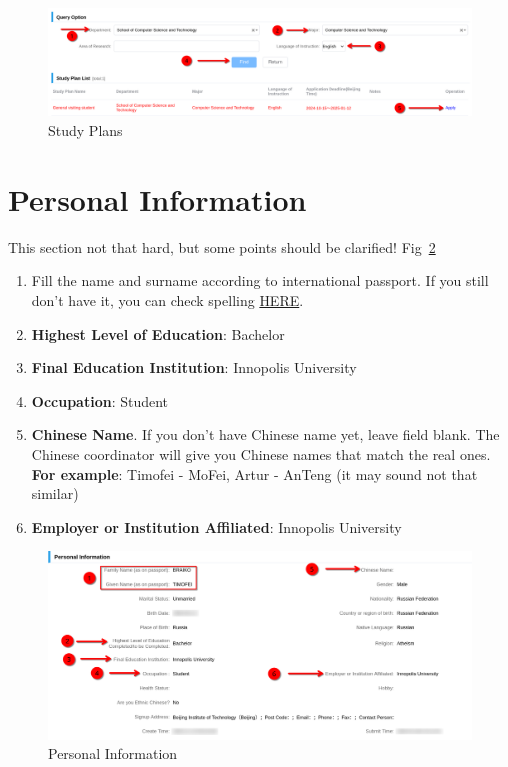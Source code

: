 \begin{figure}[htpb]
    \centering
    \includegraphics[width=\textwidth]{russia/imgs/app_3_study_plan}
    \caption{\centering Study Plans}
    \label{fig:ru_study_plan}
\end{figure}


\section{Personal Information}\label{sec:ru_personal_info}

This section not that hard, but some points should be clarified!
Fig~\ref{fig:ru_pers_info}

\begin{enumerate}
    \item Fill the name and surname according to international passport.
        If you still don't have it, you can check spelling
        \href{https://www.gosuslugi.ru/help/faq/foreign_passport/100359}{HERE}.

    \item \textbf{Highest Level of Education}: Bachelor

    \item \textbf{Final Education Institution}: Innopolis University

    \item \textbf{Occupation}: Student

    \item \textbf{Chinese Name}.
        If you don't have Chinese name yet, leave field blank.
        The Chinese coordinator will give you Chinese names that match the real ones. \\
        \textbf{For example}: Timofei - MoFei, Artur - AnTeng (it may sound not that similar)

    \item \textbf{Employer or Institution Affiliated}: Innopolis University
\end{enumerate}


\begin{figure}[H]
    \centering
    \includegraphics[width=\textwidth]{russia/imgs/app_4_personal_info}
    \caption{\centering Personal Information}
    \label{fig:ru_pers_info}
\end{figure}



